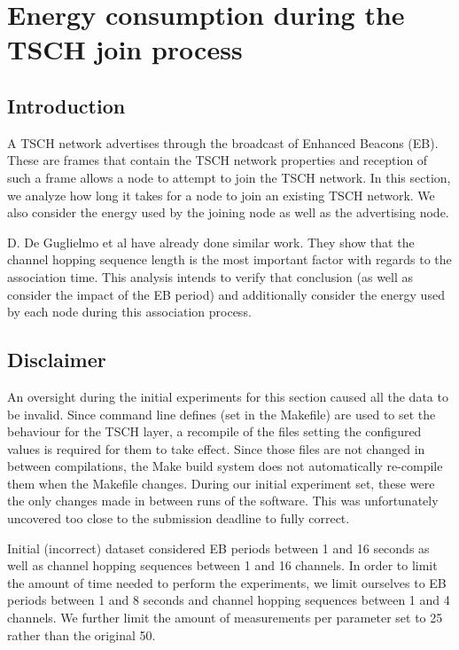 \documentclass[conference]{IEEEtran}
\renewcommand\_{\textunderscore\allowbreak}
\begin{document}
\section{Energy consumption during the TSCH join process}
\label{section:task2}

\subsection{Introduction} 

A TSCH network advertises through the broadcast of Enhanced Beacons (EB). These are frames that contain the TSCH network properties and reception of such a frame allows a node to attempt to join the TSCH network. In this section, we analyze how long it takes for a node to join an existing TSCH network. We also consider the energy used by the joining node as well as the advertising node.

D. De Guglielmo et al have already done similar work\cite{JoinProcess}. They show that the channel hopping sequence length is the most important factor with regards to the association time. This analysis intends to verify that conclusion (as well as consider the impact of the EB period) and additionally consider the energy used by each node during this association process. 

\subsection{Disclaimer}
\label{sec:t2_discl}
An oversight during the initial experiments for this section caused all the data to be invalid. Since command line defines (set in the Makefile) are used to set the behaviour for the TSCH layer, a recompile of the files setting the configured values is required for them to take effect. Since those files are not changed in between compilations, the Make build system does not automatically re-compile them when the Makefile changes. During our initial experiment set, these were the only changes made in between runs of the software. This was unfortunately uncovered too close to the submission deadline to fully correct.

Initial (incorrect) dataset considered EB periods between 1 and 16 seconds as well as channel hopping sequences between 1 and 16 channels. In order to limit the amount of time needed to perform the experiments, we limit ourselves to EB periods between 1 and 8 seconds and channel hopping sequences between 1 and 4 channels. We further limit the amount of measurements per parameter set to 25 rather than the original 50. 
\end{document}
